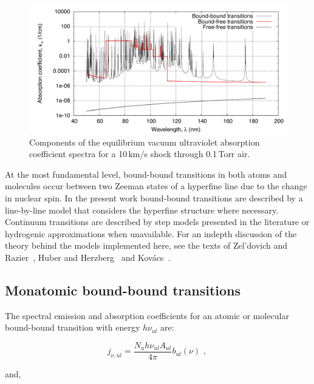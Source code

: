 \begin{figure}[h]
 \includegraphics[width=0.9\linewidth]{figures/spectral-modelling/VUV_spectra_components.pdf}
 \caption{Components of the equilibrium vacuum ultraviolet absorption coefficient spectra for a 10\,km/s shock through 0.1\,Torr air.}
 \label{fig:sample_absorption_spectra}
\end{figure}

\par

At the most fundamental level, bound-bound transitions in both atoms and molecules occur between two Zeeman states of a hyperfine line due to the change in nuclear spin.
In the present work bound-bound transitions are described by a line-by-line model that considers the hyperfine structure where necessary.
Continuum transitions are described by step models presented in the literature or hydrogenic approximations when unavailable.
For an indepth discussion of the theory behind the models implemented here, see the texts of Zel'dovich and Razier~\cite{ZR}, Huber and Herzberg~\cite{HH_1979} and Kov\'{a}cs~\cite{kovacs69}.

\subsection{Monatomic bound-bound transitions}
\label{sec:monatomic_transitions}


The spectral emission and absorption coefficients for an atomic or molecular bound-bound transition with energy $h \nu_{u l}$ are:

\begin{equation}
 j_{\nu,ul} = \frac{N_{u} h \nu_{u l} A_{u l}}{4 \pi} b_{ul}(\nu) \text{ , } \label{eq:atomic_j_nu_ul}
\end{equation}

\noindent and,


